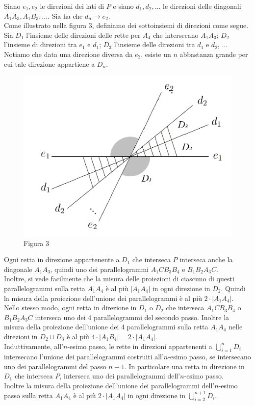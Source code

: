 \documentclass[a4paper, twoside]{article}
\newcommand{\<}{\langle}
\renewcommand{\>}{\rangle}
\begin{document}
Siano $e_{1}, e_{2}$ le direzioni dei lati di $P$ e siano $d_{1}, d_{2}, \ldots$ le direzioni delle diagonali $A_{1} A_{3}, A_{1} B_{3},...$. Sia ha che $d_{n} \rightarrow e_{2}$.\\
Come illustrato nella figura 3, definiamo dei sottoinsiemi di direzioni come segue. Sia $D_1$ l'insieme delle direzioni delle rette per $A_{4}$ che intersecano $A_{1} A_{3}$; $D_2$ l'insieme di direzioni tra $e_{1}$ e $d_{1}$; $D_3$ l'insieme delle direzioni tra $d_{1}$ e $d_{2}$, ...\\
Notiamo che data una direzione diversa da $e_2$, esiste un $n$ abbastanza grande per cui tale direzione appartiene a $D_n$.

\begin{figure} [h!]
		\includegraphics[width=0.6\columnwidth]{direzioni.png}
		\centering
		\caption{Figura 3}
\end{figure}


Ogni retta in direzione appartenente a $D_1$ che interseca $P$ interseca anche la diagonale $A_{1} A_{3}$, quindi uno dei parallelogrammi $A_{1} C B_{3} B_{4}$ e $B_{1} B_{2} A_{3} C$.\\
Inoltre, si vede facilmente che la misura delle proiezioni di ciascuno di questi parallelogrammi sulla retta $A_{1} A_{4}$ è al più $\left|A_{1} A_{4}\right|$ in ogni direzione in $D_2$. Quindi la misura della proiezione dell'unione dei parallelogrammi è al più $2 \cdot\left|A_{1} A_{4}\right|$.\\
Nello stesso modo, ogni retta in direzione in $D_1$ o $D_2$ che interseca $A_{1} C B_{3} B_{4}$ o $B_{1} B_{2} A_{3} C$ interseca uno dei 4 parallelogrammi del secondo passo. Inoltre la misura della proiezione dell'unione dei 4 parallelogrammi sulla retta $A_{1} A_{4}$ nelle direzioni in $D_2 \cup D_3$ è al più $4 \cdot\left|A_{1} B_{4}\right|=2 \cdot\left|A_{1} A_{4}\right|$.\\

Induttivamente, all'$n$-esimo passo, le rette in direzioni appartenenti a $\bigcup_{i=1}^n D_i$ intersecano l'unione dei parallelogrammi costruiti all'$n$-esimo passo, se intersecano uno dei parallelogrammi del passo $n-1$. In particolare una retta in direzione in $D_1$ che interseca $P$, interseca uno dei parallelogrammi dell'$n$-esimo passo.\\
Inoltre la misura della proiezione dell'unione dei parallelogrammi dell'$n$-esimo passo sulla retta $A_{1} A_{4}$ è al più $2 \cdot\left|A_{1} A_{4}\right|$ in ogni direzione in $\bigcup_{i=2}^{n+1}D_i$.\\
\end{document}
